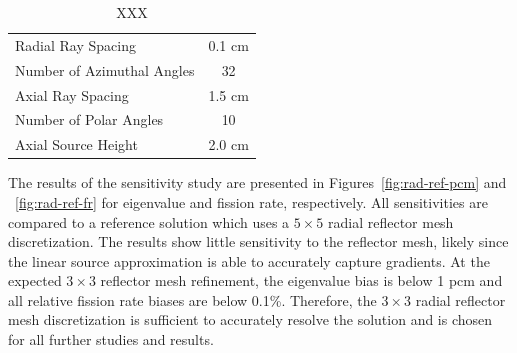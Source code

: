\begin{table}[ht]
	\centering
	\caption{XXX}
	\medskip
	\begin{tabular}{lc}
		\hline
		Radial Ray Spacing & 0.1 cm \\
		Number of Azimuthal Angles & 32 \\
		Axial Ray Spacing & 1.5 cm \\
		Number of Polar Angles & 10 \\
		Axial Source Height & 2.0 cm \\
		\hline
	\end{tabular}
	\label{tab:rad-ref-refinement-params}
\end{table}

The results of the sensitivity study are presented in Figures~\ref{fig:rad-ref-pcm} and ~\ref{fig:rad-ref-fr} for eigenvalue and fission rate, respectively. All sensitivities are compared to a reference solution which uses a $5\times 5$ radial reflector mesh discretization. The results show little sensitivity to the reflector mesh, likely since the linear source approximation is able to accurately capture gradients. At the expected $3 \times 3$ reflector mesh refinement, the eigenvalue bias is below 1 pcm and all relative fission rate biases are below 0.1\%. Therefore, the  $3 \times 3$ radial reflector mesh discretization is sufficient to accurately resolve the solution and is chosen for all further studies and results.

